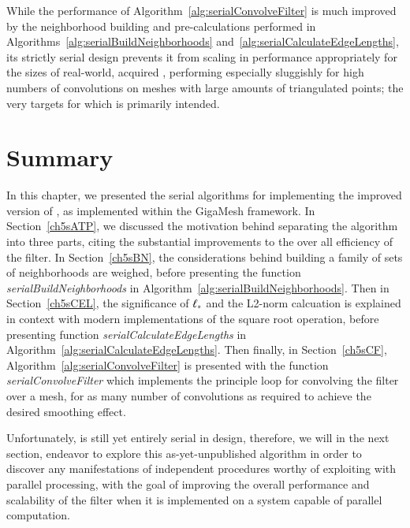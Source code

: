 %
%
%

While the performance of Algorithm~\ref{alg:serialConvolveFilter} is much improved by the neighborhood building and pre-calculations performed in Algorithms~\ref{alg:serialBuildNeighborhoods} and~\ref{alg:serialCalculateEdgeLengths}, its strictly serial design prevents it from scaling in performance appropriately for the sizes of real-world, acquired \tdd{}, performing especially sluggishly for high numbers of convolutions on meshes with large amounts of triangulated points; the very targets for which  is primarily intended.

%
%
%
%
\section{Summary}
\label{ch5sDN}
In this chapter, we presented the serial algorithms for implementing the improved version of , as implemented within the GigaMesh framework. In Section~\ref{ch5sATP}, we discussed the motivation behind separating the algorithm into three parts, citing the substantial improvements to the over all efficiency of the filter. In Section~\ref{ch5sBN}, the considerations behind building a family of sets of neighborhoods are weighed, before presenting the function \textit{serialBuildNeighborhoods} in Algorithm~\ref{alg:serialBuildNeighborhoods}. Then in Section~\ref{ch5sCEL}, the significance of $\ell_\ast$ and the L2-norm calcuation is explained in context with modern implementations of the square root operation, before presenting function \textit{serialCalculateEdgeLengths} in Algorithm~\ref{alg:serialCalculateEdgeLengths}.   Then finally, in Section~\ref{ch5sCF}, Algorithm~\ref{alg:serialConvolveFilter} is presented with the function \textit{serialConvolveFilter} which implements the principle loop for convolving the filter over a mesh, for as many number of convolutions as required to achieve the desired smoothing effect.

Unfortunately,  is still yet entirely serial in design, therefore, we will in the next section, endeavor to explore this as-yet-unpublished algorithm in order to discover any manifestations of independent procedures worthy of exploiting with parallel processing, with the goal of improving the overall performance and scalability of the filter when it is implemented on a system capable of parallel computation.

